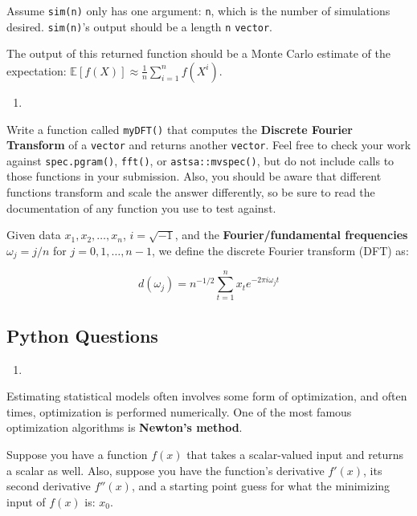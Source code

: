 \documentclass[12pt,krantz2]{krantz}
\begin{document}
Assume \texttt{sim(n)} only has one argument: \texttt{n}, which is the number of simulations desired. \texttt{sim(n)}'s output should be a length \texttt{n} \texttt{vector}.

The output of this returned function should be a Monte Carlo estimate of the expectation: \(\mathbb{E}[f(X)] \approx \frac{1}{n}\sum_{i=1}^n f(X^i)\).

\begin{enumerate}
\def\labelenumi{\arabic{enumi}.}
\setcounter{enumi}{2}
\item
\end{enumerate}

Write a function called \texttt{myDFT()} that computes the \textbf{Discrete Fourier Transform} of a \texttt{vector} and returns another \texttt{vector}. Feel free to check your work against \texttt{spec.pgram()}, \texttt{fft()}, or \texttt{astsa::mvspec()}, but do not include calls to those functions in your submission. Also, you should be aware that different functions transform and scale the answer differently, so be sure to read the documentation of any function you use to test against.

Given data \(x_1,x_2,\ldots,x_n\), \(i = \sqrt{-1}\), and the \textbf{Fourier/fundamental frequencies} \(\omega_j= j/n\) for \(j=0,1,\ldots,n-1\), we define the discrete Fourier transform (DFT) as:

\begin{equation} \label{eq:DFT}
d(\omega_j)= n^{-1/2} \sum_{t=1}^n x_t e^{-2 \pi i \omega_j t}
\end{equation}

\hypertarget{python-questions-4}{%
\subsection{Python Questions}\label{python-questions-4}}

\begin{enumerate}
\def\labelenumi{\arabic{enumi}.}
\item
\end{enumerate}

Estimating statistical models often involves some form of optimization, and often times, optimization is performed numerically. One of the most famous optimization algorithms is \textbf{Newton's method}.

Suppose you have a function \(f(x)\) that takes a scalar-valued input and returns a scalar as well. Also, suppose you have the function's derivative \(f'(x)\), its second derivative \(f''(x)\), and a starting point guess for what the minimizing input of \(f(x)\) is: \(x_0\).
\end{document}
